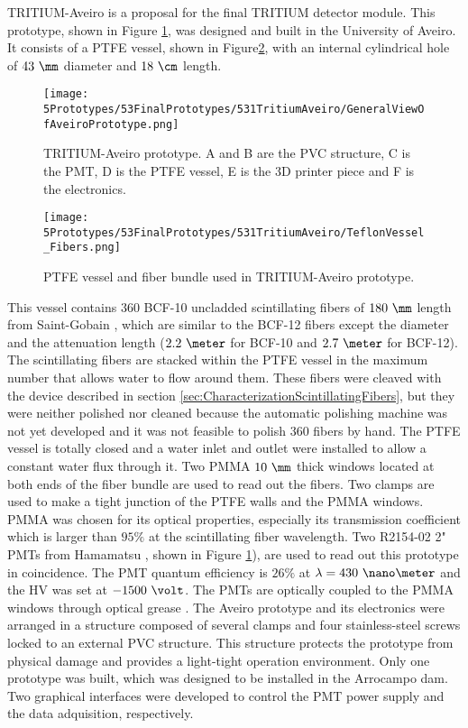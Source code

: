 TRITIUM-Aveiro is a proposal for the final TRITIUM detector module. This prototype, shown in Figure \ref{fig:TritiumAveiro0}, was designed and built in the University of Aveiro. It consists of a PTFE vessel, shown in Figure\ref{fig:TeflonStructureFibersTritiumAveiro0}, with an internal cylindrical hole of $43~\mm$ diameter and $18~\cm$ length.
\begin{figure}[h]
\centering
\texttt{[image: 5Prototypes/53FinalPrototypes/531TritiumAveiro/GeneralViewOfAveiroPrototype.png]}
\caption{TRITIUM-Aveiro prototype. A and B are the PVC structure, C is the PMT, D is the PTFE vessel, E is the 3D printer piece and F is the electronics.\label{fig:TritiumAveiro0}}
\end{figure}
\begin{figure}[h]
\centering
\texttt{[image: 5Prototypes/53FinalPrototypes/531TritiumAveiro/TeflonVessel\_Fibers.png]}
\caption{PTFE vessel and fiber bundle used in TRITIUM-Aveiro prototype.  \label{fig:TeflonStructureFibersTritiumAveiro0}}
\end{figure}
This vessel contains $360$ BCF-10 uncladded scintillating fibers of $180~\mm$ length from Saint-Gobain \cite{DataSheetBCF12Fiber}, which are similar to the BCF-12 fibers except the diameter and the attenuation length ($2.2~\meter$ for BCF-10 and $2.7~\meter$ for BCF-12). The scintillating fibers are stacked within the PTFE vessel in the maximum number that allows water to flow around them. These fibers were cleaved with the device described in section \ref{sec:CharacterizationScintillatingFibers}, but they were neither polished nor cleaned because the automatic polishing machine was not yet developed and it was not feasible to polish 360 fibers by hand. The PTFE vessel is totally closed and a water inlet and outlet were installed to allow a constant water flux through it. Two PMMA $10~\mm$ thick windows located at both ends of the fiber bundle are used to read out the fibers. Two clamps are used to make a tight junction of the PTFE walls and the PMMA windows. PMMA was chosen for its optical properties, especially its transmission coefficient which is larger than $95\%$ at the scintillating fiber wavelength. Two R2154-02 2" PMTs from Hamamatsu \cite{DataSheetPMTsAveiro}, shown in Figure \ref{fig:TritiumAveiro0}), are used to read out this prototype in coincidence. The PMT quantum efficiency is $26\%$ at $\lambda=430~\nano\meter$ and the HV was set at $-1500~\volt$. The PMTs are optically coupled to the PMMA windows through optical grease \cite{OpticalGrease}. The Aveiro prototype and its electronics were arranged in a structure composed of several clamps and four stainless-steel screws locked to an external PVC structure. This structure protects the prototype from physical damage and provides a light-tight operation environment. Only one prototype was built, which was designed to be installed in the Arrocampo dam. Two graphical interfaces were developed to control the PMT power supply and the data adquisition, respectively. 

